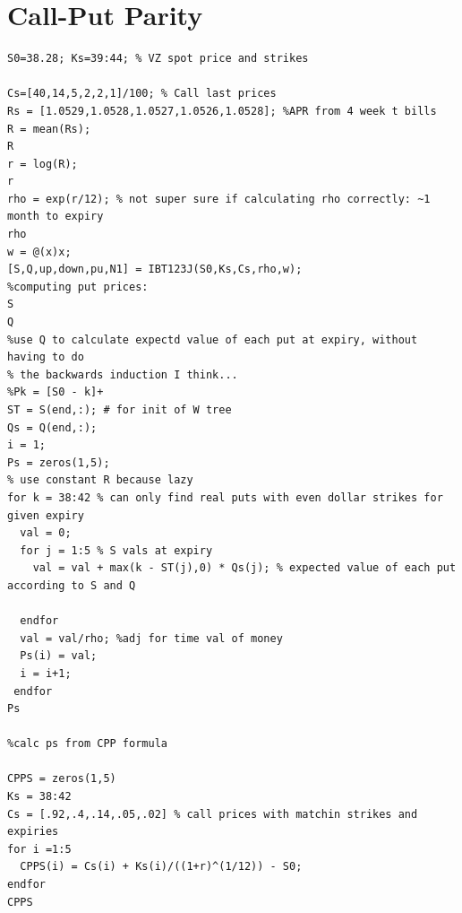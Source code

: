 \documentclass{article}
\begin{document}
\section{Call-Put Parity}
\label{app:appendix3}
\begin{lstlisting}
S0=38.28; Ks=39:44; % VZ spot price and strikes

Cs=[40,14,5,2,2,1]/100; % Call last prices
Rs = [1.0529,1.0528,1.0527,1.0526,1.0528]; %APR from 4 week t bills
R = mean(Rs);
R
r = log(R);
r
rho = exp(r/12); % not super sure if calculating rho correctly: ~1 month to expiry
rho
w = @(x)x;
[S,Q,up,down,pu,N1] = IBT123J(S0,Ks,Cs,rho,w);
%computing put prices:
S
Q
%use Q to calculate expectd value of each put at expiry, without having to do 
% the backwards induction I think...
%Pk = [S0 - k]+
ST = S(end,:); # for init of W tree
Qs = Q(end,:);
i = 1;
Ps = zeros(1,5);
% use constant R because lazy
for k = 38:42 % can only find real puts with even dollar strikes for given expiry
  val = 0;
  for j = 1:5 % S vals at expiry
    val = val + max(k - ST(j),0) * Qs(j); % expected value of each put according to S and Q
    
  endfor
  val = val/rho; %adj for time val of money
  Ps(i) = val;
  i = i+1;
 endfor
Ps

%calc ps from CPP formula

CPPS = zeros(1,5)
Ks = 38:42
Cs = [.92,.4,.14,.05,.02] % call prices with matchin strikes and expiries
for i =1:5
  CPPS(i) = Cs(i) + Ks(i)/((1+r)^(1/12)) - S0;
endfor
CPPS
  


\end{lstlisting}
\end{document}
